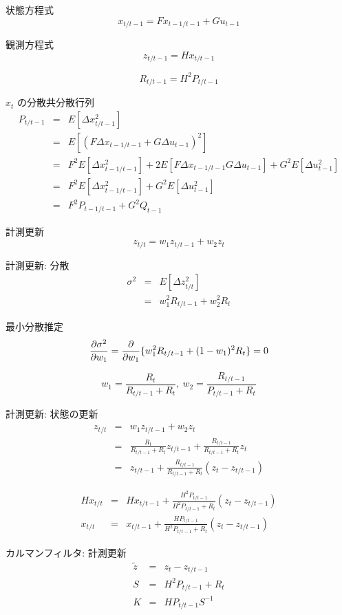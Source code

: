 \documentclass{jarticle}
\begin{document}
状態方程式
$$
x_{t/t-1} = Fx_{t-1/t-1} + Gu_{t-1}
$$

観測方程式
$$
z_{t/t-1} = Hx_{t/t-1}
$$

$$
R_{t/t-1} = H^2 P_{t/t-1}
$$

$x_{t}$ の分散共分散行列
\begin{eqnarray}
P_{t/t-1}
&=& E[\Delta x^2_{t/t-1}] \nonumber \\
&=& E[(F\Delta x_{t-1/t-1} + G\Delta u_{t-1})^2] \nonumber \\
&=& F^2 E[\Delta x_{t-1/t-1}^2] + 2 E[F \Delta x_{t-1/t-1} G \Delta u_{t-1}] + G^2 E[\Delta u_{t-1}^2] \nonumber \\
&=& F^2 E[\Delta x_{t-1/t-1}^2] + G^2 E[\Delta u_{t-1}^2] \nonumber \\
&=& F^2 P_{t-1/t-1} + G^2 Q_{t-1} \nonumber
\end{eqnarray}

計測更新
$$
z_{t/t} = w_{1} z_{t/t-1} + w_{2} z_{t}
$$

計測更新: 分散
\begin{eqnarray}
\sigma^2
&=& E[\Delta z_{t/t}^2] \nonumber \\
&=& w_{1}^2 R_{t/t-1} + w_{2}^2 R_{t} \nonumber
\end{eqnarray}

最小分散推定
$$
\frac{\partial \sigma^2}{\partial w_{1}} = \frac{\partial }{\partial w_{1}} \{ w_{1}^2 R_{t/t-1} + (1 - w_{1})^2 R_{t} \} = 0 \nonumber \\
$$

$$
w_{1} = \frac{R_{t}}{R_{t/t-1} + R_{t}},\ w_{2} = \frac{R_{t/t-1}}{P_{t/t-1} + R_{t}}
$$

計測更新: 状態の更新
\begin{eqnarray}
z_{t/t}
&=& w_{1} z_{t/t-1} + w_{2} z_{t} \nonumber \\
&=& \frac{R_{t}}{R_{t/t-1} + R_{t}} z_{t/t-1} + \frac{R_{t/t-1}}{R_{t/t-1} + R_{t}} z_{t} \nonumber \\
&=& z_{t/t-1} + \frac{R_{t/t-1}}{R_{t/t-1} + R_{t}} (z_{t} - z_{t/t-1}) \nonumber
\end{eqnarray}

\begin{eqnarray}
H x_{t/t} &=& H x_{t/t-1} + \frac{H^2 P_{t/t-1}}{H^2 P_{t/t-1} + R_{t}} (z_{t} - z_{t/t-1}) \nonumber \\
x_{t/t} &=& x_{t/t-1} + \frac{H P_{t/t-1}}{H^2 P_{t/t-1} + R_{t}} (z_{t} - z_{t/t-1}) \nonumber
\end{eqnarray}

カルマンフィルタ: 計測更新
\begin{eqnarray}
\tilde{z} &=& z_{t} - z_{t/t-1} \nonumber \\
S &=& H^2 P_{t/t-1} + R_{t} \nonumber \\
K &=& H P_{t/t-1} S^{-1} \nonumber
\end{eqnarray}
\end{document}

